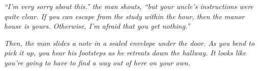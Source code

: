 \documentclass[a6paper, parskip=half, DIV=14, 12pt]{scrartcl}
\begin{document}
\textit{``I'm very sorry about this.'' the man shouts, ``but your uncle's instructions were quite clear. If you can escape from the study within the hour, then the manor house is yours. Otherwise, I'm afraid that you get nothing.''}

\textit{Then, the man slides a note in a sealed envelope under the door. As you bend to pick it up, you hear his footsteps as he retreats down the hallway. It looks like you're going to have to find a way out of here on your own.}

%
%
%
%
%
%
%
%
%
%
%
%
%
%
%
%
%
%
%
%
%
%
%
\end{document}
